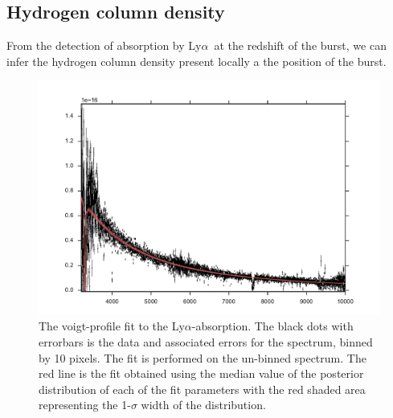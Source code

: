\documentclass[a4paper,fleqn,usenatbib]{mnras}
\newcommand{\lya}{Ly$\alpha$}
\begin{document}
\subsection{Hydrogen column density}

From the detection of absorption by \lya~at the redshift of the burst,
we can infer the hydrogen column density present locally a the
position of the burst. 





\begin{figure} %
	\includegraphics[width=\columnwidth]{figures/DLA_fit.pdf} \caption{The
		voigt-profile fit to the \lya-absorption. The black dots with errorbars is the
		data and associated errors for the spectrum, binned by 10 pixels. The fit is
		performed on the un-binned spectrum. The red line is the fit obtained using the
		median value of the posterior distribution of each of the fit parameters with
		the red shaded area representing the 1-$\sigma$ width of the distribution.}
	\label{fig:example_figure} \end{figure}
\end{document}

